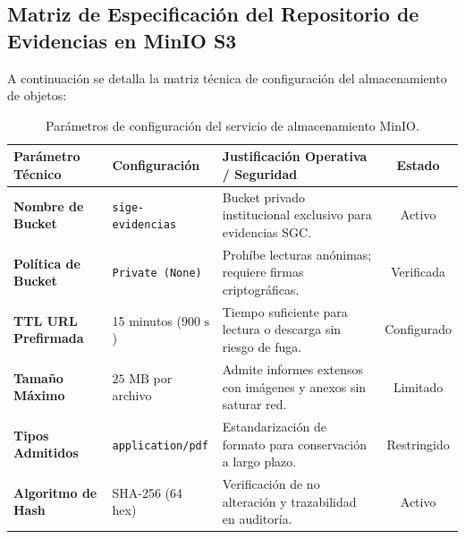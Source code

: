 \documentclass[12pt,a4paper]{article}
\begin{document}
\subsection{Matriz de Especificación del Repositorio de Evidencias en MinIO S3}
A continuación se detalla la matriz técnica de configuración del almacenamiento de objetos:
\begin{table}[H]
\centering
\small
\renewcommand{\arraystretch}{1.2}
\begin{tabularx}{\textwidth}{|>{\bfseries}m{3.2cm}|m{3.0cm}|X|c|}
\hline
\rowcolor{tableheader}
\textbf{Parámetro Técnico} & \textbf{Configuración} & \textbf{Justificación Operativa / Seguridad} & \textbf{Estado} \\
\hline
Nombre de Bucket & \texttt{sige- evidencias} & Bucket privado institucional exclusivo para evidencias SGC. & Activo \\
\hline
Política de Bucket & \texttt{Private (None)} & Prohíbe lecturas anónimas; requiere firmas criptográficas. & Verificada \\
\hline
TTL URL Prefirmada & 15 minutos ($900\text{ s}$) & Tiempo suficiente para lectura o descarga sin riesgo de fuga. & Configurado \\
\hline
Tamaño Máximo & $25\text{ MB}$ por archivo & Admite informes extensos con imágenes y anexos sin saturar red. & Limitado \\
\hline
Tipos Admitidos & \texttt{application/\allowbreak  pdf} & Estandarización de formato para conservación a largo plazo. & Restringido \\
\hline
Algoritmo de Hash & SHA-256 (64 hex) & Verificación de no alteración y trazabilidad en auditoría. & Activo \\
\hline
\end{tabularx}
\caption{Parámetros de configuración del servicio de almacenamiento MinIO.}
\label{tab:minio_matrix}
\end{table}
\end{document}
